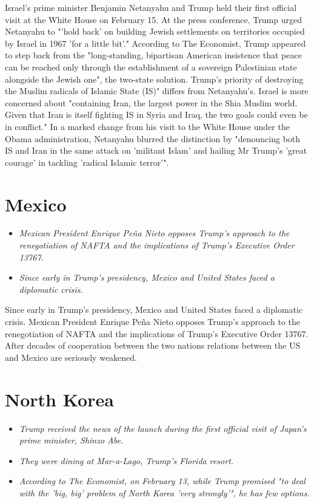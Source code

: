 Israel's prime minister Benjamin Netanyahu and Trump held their first
official visit at the White House on February 15. At the press
conference, Trump urged Netanyahu to "'hold back' on building Jewish
settlements on territories occupied by Israel in 1967 'for a little
bit'." According to The Economist, Trump appeared to step back from the
"long-standing, bipartisan American insistence that peace can be reached
only through the establishment of a sovereign Palestinian state
alongside the Jewish one", the two-state solution. Trump's priority of
destroying the Muslim radicals of Islamic State (IS)" differs from
Netanyahu's. Israel is more concerned about "containing Iran, the
largest power in the Shia Muslim world. Given that Iran is itself
fighting IS in Syria and Iraq, the two goals could even be in conflict."
In a marked change from his visit to the White House under the Obama
administration, Netanyahu blurred the distinction by "denouncing both IS
and Iran in the same attack on 'militant Islam' and hailing Mr Trump's
'great courage' in tackling 'radical Islamic terror'".

\section{Mexico}\label{mexico}

\begin{itemize}
\item
  \emph{Mexican President Enrique Peña Nieto opposes Trump's approach to
  the renegotiation of NAFTA and the implications of Trump's Executive
  Order 13767.}
\item
  \emph{Since early in Trump's presidency, Mexico and United States
  faced a diplomatic crisis.}
\end{itemize}

Since early in Trump's presidency, Mexico and United States faced a
diplomatic crisis. Mexican President Enrique Peña Nieto opposes Trump's
approach to the renegotiation of NAFTA and the implications of Trump's
Executive Order 13767. After decades of cooperation between the two
nations relations between the US and Mexico are seriously weakened.

\section{North Korea}\label{north-korea}

\begin{itemize}
\item
  \emph{Trump received the news of the launch during the first official
  visit of Japan's prime minister, Shinzo Abe.}
\item
  \emph{They were dining at Mar-a-Lago, Trump's Florida resort.}
\item
  \emph{According to The Economist, on February 13, while Trump promised
  "to deal with the 'big, big' problem of North Korea 'very strongly'",
  he has few options.}
\end{itemize}

